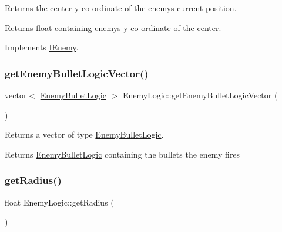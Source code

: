 Returns the center y co-\/ordinate of the enemy\textquotesingle{}s current position. 

\begin{DoxyReturn}{Returns}
float containing enemy\textquotesingle{}s y co-\/ordinate of the center. 
\end{DoxyReturn}


Implements \hyperlink{class_i_enemy}{I\+Enemy}.

\mbox{\label{class_enemy_logic_ae4e49b9f854bc0407510de8e3824c7c4}} 
\subsubsection{\texorpdfstring{get\+Enemy\+Bullet\+Logic\+Vector()}{getEnemyBulletLogicVector()}}
{\footnotesize\ttfamily vector$<$ \hyperlink{class_enemy_bullet_logic}{Enemy\+Bullet\+Logic} $>$ Enemy\+Logic\+::get\+Enemy\+Bullet\+Logic\+Vector (\begin{DoxyParamCaption}{ }\end{DoxyParamCaption})}



Returns a vector of type \hyperlink{class_enemy_bullet_logic}{Enemy\+Bullet\+Logic}. 

\begin{DoxyReturn}{Returns}
\hyperlink{class_enemy_bullet_logic}{Enemy\+Bullet\+Logic} containing the bullets the enemy fires 
\end{DoxyReturn}
\mbox{\label{class_enemy_logic_ab6736c870e69bc20bef8d6d010946eb2}} 
\subsubsection{\texorpdfstring{get\+Radius()}{getRadius()}}
{\footnotesize\ttfamily float Enemy\+Logic\+::get\+Radius (\begin{DoxyParamCaption}{ }\end{DoxyParamCaption})\hspace{0.3cm}{\ttfamily [virtual]}}



